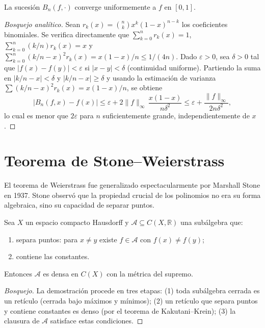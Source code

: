 \begin{theorem}[Bernstein]
\label{teo:bernstein}
La sucesión $B_n(f,\cdot)$ converge uniformemente a $f$ en $[0,1]$.
\end{theorem}
\begin{proof}[Bosquejo analítico]
Sean $r_k(x)=\binom{n}{k}x^k(1-x)^{n-k}$ los coeficientes binomiales. Se verifica directamente que $\sum_{k=0}^n r_k(x)=1$, $\sum_{k=0}^n (k/n)r_k(x)=x$ y $\sum_{k=0}^n (k/n-x)^2 r_k(x)=x(1-x)/n\leq 1/(4n)$. Dado $\varepsilon>0$, sea $\delta>0$ tal que $|f(x)-f(y)|<\varepsilon$ si $|x-y|<\delta$ (continuidad uniforme). Partiendo la suma en $|k/n-x|<\delta$ y $|k/n-x|\geq\delta$ y usando la estimación de varianza $\sum (k/n-x)^2 r_k(x)=x(1-x)/n$, se obtiene
\[
  |B_n(f,x)-f(x)|\leq\varepsilon+2\|f\|_\infty\,\frac{x(1-x)}{n\delta^2}\leq\varepsilon+\frac{\|f\|_\infty}{2n\delta^2},
\]
lo cual es menor que $2\varepsilon$ para $n$ suficientemente grande, independientemente de $x$.
\end{proof}

\section{Teorema de Stone--Weierstrass}

El teorema de Weierstrass fue generalizado espectacularmente por Marshall Stone en 1937. Stone observó que la propiedad crucial de los polinomios no era su forma algebraica, sino su capacidad de separar puntos.

\begin{theorem}
\label{teo:stone-weierstrass}
Sea $X$ un espacio compacto Hausdorff y $\mathcal{A}\subseteq C(X,\mathbb{R})$ una subálgebra que:
\begin{enumerate}
  \item[(i)] separa puntos: para $x\neq y$ existe $f\in\mathcal{A}$ con $f(x)\neq f(y)$;
  \item[(ii)] contiene las constantes.
\end{enumerate}
Entonces $\mathcal{A}$ es densa en $C(X)$ con la métrica del supremo.
\end{theorem}
\begin{proof}[Bosquejo]
La demostración procede en tres etapas: (1) toda subálgebra cerrada es un retículo (cerrada bajo máximos y mínimos); (2) un retículo que separa puntos y contiene constantes es denso (por el teorema de Kakutani--Krein); (3) la clausura de $\mathcal{A}$ satisface estas condiciones.
\end{proof}

